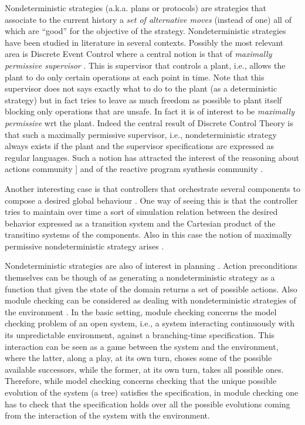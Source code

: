 Nondeterministic strategies (a.k.a. plans or protocols) are strategies
that associate to the current history a \emph{set of alternative
  moves} (instead of one) all of which are ``good'' for the objective
of the strategy.
Nondeterministic strategies have been studied in literature in several
contexts.
Possibly the most relevant area is Discrete Event Control where a
central notion is that of \emph{maximally permissive supervisor}
\cite{WonhamRamadge:SIAMJCO87,Cassandras:BOOK06_DES,Wo14}. This is
supervisor that controls a plant, i.e., allows the plant to do only
certain operations at each point in time. Note that this supervisor
does not says exactly what to do to the plant (as a deterministic
strategy) but in fact tries to leave as much freedom as possible to
plant itself blocking only operations that are unsafe. In fact it is
of interest to be \emph{maximally permissive} wrt the plant. 
Indeed the central result of Discrete Control Theory is that such a
maximally permissive supervisor, i.e., nondeterministic strategy
always exists if the plant and the supervisor specifications are
expressed as regular languages. Such a notion has attracted the interest
of the reasoning about actions community
]\cite{DeGiacomoLM12,BanihashemiGL-AAMAS18} and of the reactive program
synthesis community \cite{pnueli1989synthesisshort,EhlersLTV17}.


Another interesting case is that controllers that orchestrate several components to compose a desired global behaviour \cite{DePS13,DeGiacomoVFAL18}. One way of seeing this is that the controller tries to maintain over time a sort of simulation relation between the desired behavior expressed as a transition system and the Cartesian product of the transitino systems of the components. Also in this case the notion of maximally permissive nondeterministic strategy arises \cite{DePS13}.


Nondeterministic strategies are also of interest in planning \cite{GeffnerBo13}.  Action preconditions themselves can be though of as generating a nondeterministic strategy  as a function that given the state of the domain returns a set of possible actions. 
Also module checking can be considered as dealing with nondeterministic strategies of the environment \cite{kupferman1997module,jamroga2014module}. In the basic setting, module checking concerns the model checking problem of an open system, i.e., a system interacting continuously with its unpredictable environment, against a branching-time specification. This interaction can be seen as a game between the system and the environment, where the latter, along a play, at its own turn, choses some of the possible available successors, while the former, at its own turn, takes all possible ones. Therefore, while model checking concerns checking that the unique possible evolution of the system (a tree) satisfies the specification, in module checking one has to check that the specification holds over all the possible evolutions coming from the interaction of the system with the environment.

